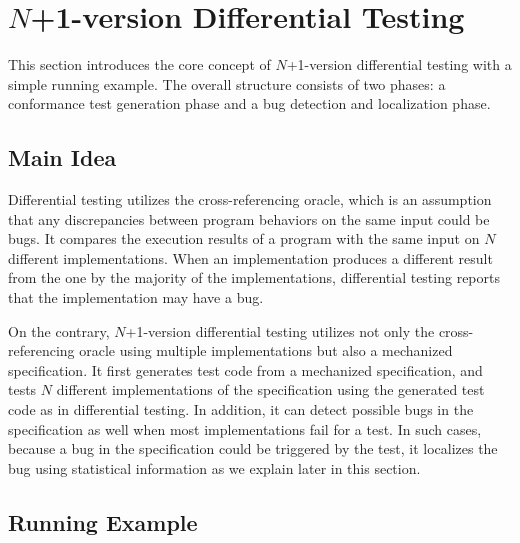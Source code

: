 \section{$N$+1-version Differential Testing}\label{sec:idea}
This section introduces the core concept of $N$+1-version differential testing with a
simple running example.  The overall structure consists of two
phases: a conformance test generation phase and a bug detection and localization
phase.

\subsection{Main Idea}

Differential testing utilizes the cross-referencing oracle, which is
an assumption that any discrepancies between program behaviors on the same input
could be bugs.  It compares the execution results of a program with the same
input on $N$ different implementations.  When an implementation produces a different
result from the one by the majority of the implementations, differential testing
reports that the implementation may have a bug.

On the contrary, $N$+1-version differential testing utilizes not only the cross-referencing oracle
using multiple implementations but also a mechanized specification.  It first
generates test code from a mechanized specification, and tests 
$N$ different implementations of the specification using the generated test code
as in differential testing.  In addition, it can detect possible bugs in the specification
as well when most implementations fail for a test.  In such cases,
because a bug in the specification could be triggered by the test, it
localizes the bug using statistical information as we explain later in this section.


\subsection{Running Example}

